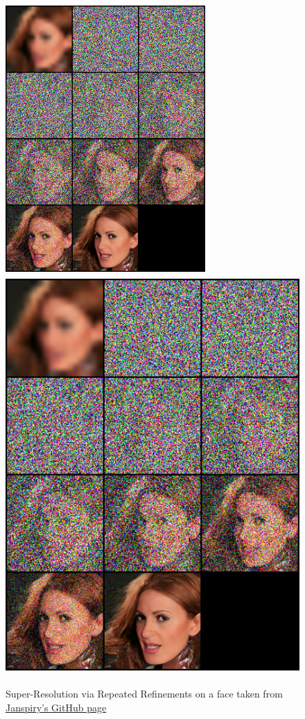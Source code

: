 \begin{figure}[!htbp]
  \begin{center}
    \leavevmode
    \ifpdf
      \includegraphics[height=4in]{Chapter1/Chapter1Figs/sr3.png}
    \else
      \includegraphics[bb = 92 86 545 742, height=6in]{Chapter1/Chapter1Figs/sr3.png}
    \fi
    \caption{Super-Resolution via Repeated Refinements on a face taken from \href{https://github.com/Janspiry/Image-Super-Resolution-via-Iterative-Refinement}{Janspiry's GitHub page}}
    \label{SR3-face}
  \end{center}
\end{figure}

